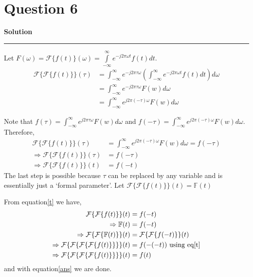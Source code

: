 \documentclass[a4paper]{article}
\title{\cooltitle{CS663 Assignment-3}}
\author{{\bf Saksham Rathi, Kavya Gupta, Shravan Srinivasa Raghavan} \\
\small Department of Computer Science, \\
Indian Institute of Technology Bombay \\}
\date{}
\newenvironment{solution}[2][]{%
    \begin{mdframed}[linecolor=green!60!black, linewidth=2pt, roundcorner=10pt, backgroundcolor=green!5!white, skipabove=12pt, skipbelow=12pt]%
        \textbf{\large #2} %
        \par\noindent\rule{\textwidth}{0.4pt} %
        \vspace{0.5em} %
}{%
    \end{mdframed}%
}
\begin{document}
\maketitle
\section*{Question 6}

\begin{solution}{Solution}
    Let $F(\omega) = \mathcal{F} \{f(t)\}(\omega) = \int\limits_{-\infty}^{\infty} e^{-j2\pi\omega t} f(t)dt$.
    \begin{align*}
        \mathcal{F}\{\mathcal{F}\{f(t)\}\}(\tau) 
        &= \int_{-\infty}^{\infty} e^{-j2\pi\tau\omega} 
        \left( \int_{-\infty}^{\infty} e^{-j2\pi\omega t}f(t) dt \right) d\omega \\
        &= \int_{-\infty}^{\infty} e^{-j2\pi\tau\omega} F(w) d\omega \\
        &= \int_{-\infty}^{\infty} e^{j2\pi(-\tau)\omega} F(w) d\omega
    \end{align*}

    Note that $f(\tau) = \int_{-\infty}^{\infty} e^{j2\pi\tau\omega} F(w) d\omega$ and 
    $f(-\tau) = \int_{-\infty}^{\infty} e^{j2\pi(-\tau)\omega} F(w) d\omega$. Therefore,
    \begin{align}
      \mathcal{F}\{\mathcal{F}\{f(t)\}\}(\tau) &= \int_{-\infty}^{\infty} e^{j2\pi(-\tau)\omega} F(w) d\omega = f(-\tau) \nonumber \\
      \Rightarrow \mathcal{F}\{\mathcal{F}\{f(t)\}\}(\tau) &= f(-\tau) \nonumber \\
      \label{t}\Rightarrow \mathcal{F}\{\mathcal{F}\{f(t)\}\}(t) &= f(-t) 
    \end{align}
    The last step is possible because $\tau$ can be replaced by any variable and is essentially just a `formal parameter'. Let
    $\mathcal{F}\{\mathcal{F}\{f(t)\}\}(t) = \mathbb{F}(t)$
    
    From equation\ref{t} we have,
    \begin{align}
      \mathcal{F}\{\mathcal{F}\{f(t)\}\}(t) &= f(-t) \nonumber \\
      \Rightarrow \mathbb{F}(t) &= f(-t) \nonumber \\
      \Rightarrow \mathcal{F}\{\mathcal{F}\{\mathbb{F}(t)\}\}(t) &= \mathcal{F}\{\mathcal{F}\{f(-t)\}\}(t) \nonumber \\
      \Rightarrow \mathcal{F}\{\mathcal{F}\{\mathcal{F}\{\mathcal{F}\{f(t)\}\}\}\}(t) &= f(-(-t)) \text{ using eq\ref{t}}\nonumber \\
      \Rightarrow \label{ans}\mathcal{F}\{\mathcal{F}\{\mathcal{F}\{\mathcal{F}\{f(t)\}\}\}\}(t) &= f(t)
    \end{align}
    and with equation\ref{ans} we are done.


\end{solution}
\end{document}
